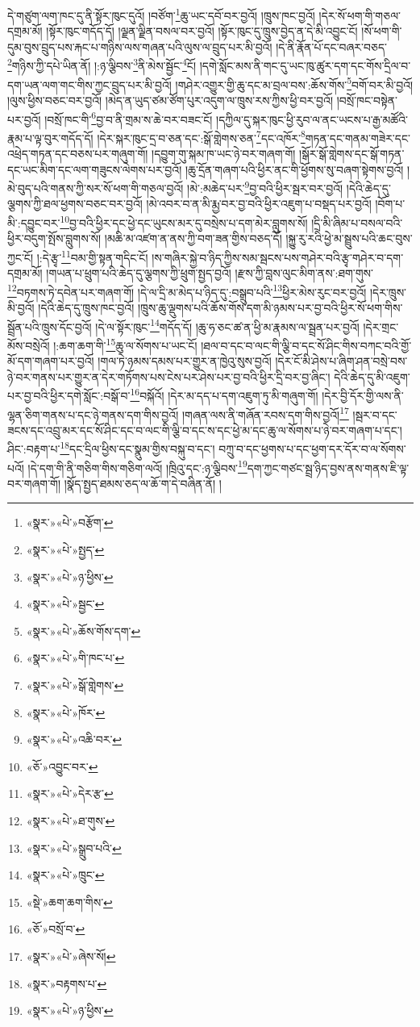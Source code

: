 དེ་གཙུག་ལག་ཁང་དུ་ནི་སྟོར་ཁུང་དུའོ། །བཙོག་\footnote{«སྣར་»«པེ་»བརྩོག་}ཆུ་ཡང་དབོ་བར་བྱའོ། །ཁྲུས་ཁང་བྱའོ། །དེར་སོ་ཕག་གི་གཅལ་དགྲམ་མོ། །སྟོར་ཁུང་གདོད་དོ། །ལྗན་ལྗིན་བསལ་བར་བྱའོ། །སྟོར་ཁུང་དུ་ཁྲུས་བྱེད་ན་དེ་མི་འབྱུང་ངོ། །སོ་ཕག་གི་དུམ་བུས་བྲུད་པས་རྐང་པ་གཉིས་ལས་གཞན་པའི་ལུས་ལ་བྲུད་པར་མི་བྱའོ། །དེ་ནི་རྣོན་པོ་དང་བཞར་བཅད་\footnote{«སྣར་»«པེ་»སྤྱད་}གཉིས་ཀྱི་དཔེ་ཡིན་ནོ། །:ཉ་ལྕིབས་\footnote{«སྣར་»«པེ་»ཉ་ཕྱིས་}ནི་མེས་སྦྱོང་\footnote{«སྣར་»«པེ་»སྦྱང་}ངོ། །དགེ་སློང་མས་ནི་གང་དུ་ཡང་ཁུ་ཚུར་དག་དང་གོས་དྲིལ་བ་དག་ཡན་ལག་གང་གིས་ཀྱང་བྲུད་པར་མི་བྱའོ། །གཤེར་འགྱུར་གྱི་ཆུ་དང་མ་བྲལ་བས་:ཆོས་གོས་\footnote{«སྣར་»«པེ་»ཆོས་གོས་དག་}བགོ་བར་མི་བྱའོ། །ལུས་ཕྱིས་བཅང་བར་བྱའོ། །མེད་ན་ཡུད་ཙམ་ཙོག་པུར་འདུག་ལ་ཁྲུས་རས་ཀྱིས་ཕྱི་བར་བྱའོ། །བསྲོ་ཁང་བསྟེན་པར་བྱའོ། །བསྲོ་ཁང་གི་\footnote{«སྣར་»«པེ་»གི་ཁང་པ་}བྱ་བ་ནི་གྲམ་ས་ཆེ་བར་བཟང་ངོ། །དཀྱིལ་དུ་སྐར་ཁུང་ཕྱི་རུབ་ལ་ནང་ཡངས་པ་རྒྱ་མཚོའི་རྣམ་པ་ལྟ་བུར་གདོད་དོ། །དེར་སྐར་ཁུང་དྲ་བ་ཅན་དང་:སྒོ་གླེགས་ཅན་\footnote{«སྣར་»«པེ་»སྒོ་གླེགས་}དང་འཁོར་\footnote{«སྣར་»«པེ་»ཁོར་}གཏན་དང་གནམ་གཟེར་དང་འཕྲེད་གཏན་དང་བཅས་པར་གཞུག་གོ། །དབྱུག་གུ་སྐམ་ཁ་ཡང་ཉེ་བར་གཞག་གོ། །སྒོར་སྒོ་གླེགས་དང་སྒོ་གཏན་དང་ཡང་མིག་དང་ལག་གཟུངས་ལེགས་པར་བྱའོ། །ཆུ་དྲོན་གཞག་པའི་ཕྱིར་ནང་གི་ཕྱོགས་སུ་བཞག་སྟེགས་བྱའོ། །མེ་བུད་པའི་གནས་ཀྱི་སར་སོ་ཕག་གི་གཅལ་བྱའོ། །མེ་:མཆེད་པར་\footnote{«སྣར་»«པེ་»འཆི་བར་}བྱ་བའི་ཕྱིར་སྦར་བར་བྱའོ། །དེའི་ཆེད་དུ་ལྕགས་ཀྱི་ཐལ་ཕྱགས་བཅང་བར་བྱའོ། །མེ་འབར་བ་ན་མི་རྨྱ་བར་བྱ་བའི་ཕྱིར་འཇུག་པ་བསྡད་པར་བྱའོ། །བོག་པ་མི་:དབྱུང་བར་\footnote{«ཅོ་»འབྱུང་བར་}བྱ་བའི་ཕྱིར་དང་ཕྱེ་དང་ཡུངས་མར་དུ་བསྲེས་པ་དག་མེར་བླུགས་སོ། །དྲི་མི་ཞིམ་པ་བསལ་བའི་ཕྱིར་བདུག་སྤོས་བླུགས་སོ། །མཆི་མ་འཛག་ན་ནས་ཀྱི་བག་ཟན་གྱིས་བཅད་དོ། །སྐྱུ་རུ་རའི་ཕྱེ་མ་སྦྲུས་པའི་ཆང་བུས་ཀྱང་ངོ། །:དེ་རྩྭ་\footnote{«སྣར་»«པེ་»དེར་རྩ་}བམ་གྱི་སྟན་གདིང་ངོ། །ས་གཞིར་སྐྱེ་བ་ཉིད་ཀྱིས་སམ་སྦངས་པས་གཤེར་བའི་རྩྭ་གཤེར་བ་དག་དགྲམ་མོ། །གཡན་པ་ཕྲུག་པའི་ཆེད་དུ་ལྕགས་ཀྱི་ཕྲུག་སྤྱད་བྱའོ། །རྫས་ཀྱི་བླས་ལུང་མིག་ནས་:ཐག་གུས་\footnote{«སྣར་»«པེ་»ཐ་གུས་}བཏགས་ཏེ་དབེན་པར་གཞག་གོ། །དེ་ལ་དྲི་མ་མེད་པ་ཉིད་དུ་:བསྒྲུབ་པའི་\footnote{«སྣར་»«པེ་»སྒྲུབ་པའི་}ཕྱིར་མེས་རུང་བར་བྱའོ། །དེར་ཁྲུས་མི་བྱའོ། །དེའི་ཆེད་དུ་ཁྲུས་ཁང་བྱའོ། །ཁྲུས་ཆུ་ལྡུགས་པའི་ཆོས་གོས་དག་མི་ཉམས་པར་བྱ་བའི་ཕྱིར་སོ་ཕག་གིས་སྦྲོན་པའི་ཁྲུས་དོང་བྱའོ། །དེ་ལ་སྟོར་ཁུང་\footnote{«སྣར་»«པེ་»ཁྲུང་}གདོད་དོ། །ཆུ་ཧ་ཅང་ཚ་ན་ཕྱི་མ་རྣམས་ལ་སྦྲན་པར་བྱའོ། །དེར་གྲང་མོས་བསྲེའོ། །:ཆག་ཆག་གི་\footnote{«སྡེ་»ཆག་ཆག་གིས་}ཆུ་ལ་སོགས་པ་ཡང་ངོ། །ཐལ་བ་དང་བ་ལང་གི་ལྕི་བ་དང་སོ་ཤིང་གིས་བཀང་བའི་གྱོ་མོ་དག་གཞག་པར་བྱའོ། །གལ་ཏེ་ཉམས་དམས་པར་གྱུར་ན་ཁྱེའུ་སུས་བྱའོ། །དེར་ངོ་མི་ཤེས་པ་ཞིག་ཤན་བསྲེ་བས་ཉེ་བར་གནས་པར་གྱུར་ན་དེར་གཏོགས་པས་ངེས་པར་ཤེས་པར་བྱ་བའི་ཕྱིར་དྲི་བར་བྱ་ཞིང་། དེའི་ཆེད་དུ་མི་འཇུག་པར་བྱ་བའི་ཕྱིར་དགེ་སློང་:བསྒོ་བ་\footnote{«ཅོ་»བསྲོ་བ་}བསྐོའོ། །དེར་མ་དད་པ་དག་འཇུག་ཏུ་མི་གཞུག་གོ། །དེར་བྱི་དོར་གྱི་ལས་ནི་ལྷན་ཅིག་གནས་པ་དང་ཉེ་གནས་དག་གིས་བྱའོ། །གཞན་ལས་ནི་གཞོན་རབས་དག་གིས་བྱའོ།\footnote{«སྣར་»«པེ་»ཞེས་སོ།} །སྦར་བ་དང་ཟངས་དང་འབྲུ་མར་དང་སོ་ཤིང་དང་བ་ལང་གི་ལྕི་བ་དང་ས་དང་ཕྱེ་མ་དང་ཆུ་ལ་སོགས་པ་ཉེ་བར་གཞག་པ་དང་། ཤིང་:བརྟག་པ་\footnote{«སྣར་»བརྟགས་པ་}དང་དྲིལ་ཕྱིས་དང་སྣུམ་གྱིས་བསྐུ་བ་དང་། བཀྲུ་བ་དང་ཕྱགས་པ་དང་ཕྱག་དར་དོར་བ་ལ་སོགས་པའོ། །དེ་དག་གི་ནི་གཅིག་གིས་གཅིག་ལའོ། །ཁྲིའུ་དང་:ཉ་ལྕིབས་\footnote{«སྣར་»«པེ་»ཉ་ཕྱིས་}དག་ཀྱང་གཙང་སྦྲ་ཉིད་བྱས་ནས་གནས་ཇི་ལྟ་བར་གཞག་གོ། །སྣོད་སྤྱད་ཐམས་ཅད་ལ་ཆོ་ག་དེ་བཞིན་ནོ། །
